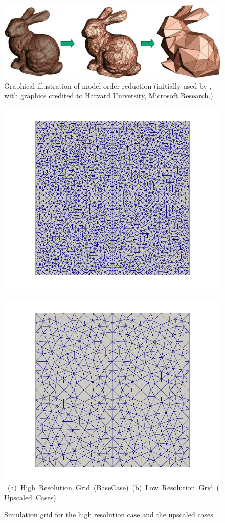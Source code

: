 

\begin{figure}[ht] 
\vbox{\vspace{-1cm}
\centering
\includegraphics[width=.56\textwidth]{./Pics/Introduction/Graphical-illustration-of-model-order-reduction.png}
\vspace{0.cm}
\vspace{0.5cm}
}   
\caption{Graphical illustration of model order reduction (initially used by \citet{Schilders2008}, with graphics credited to Harvard University, Microsoft Research.)}
\vspace{1.5cm}
\label{fig:IllustrationMOR}
\end{figure}

\begin{figure}[ht] 
\vbox{\vspace{-1cm}
\hbox{\includegraphics[width=.56\textwidth]{./Pics/BaseCase/BaseCase_MeshOnly.png}
      \includegraphics[width=.56\textwidth]{./Pics/ArithMeanCase/ArithMeanCase_MeshOnly.png}}
\vspace{0.cm}
\hbox{\hspace{0.25cm} (a) High Resolution Grid (BaseCase) \hspace{0.75cm} (b) Low Resolution Grid (Upscaled Cases) \hspace{3.0cm}}
\vspace{0.5cm}
}   
\caption{Simulation grid for the high resolution case and the upscaled cases}
\label{fig:HiRes_LowRes_Mesh}
\end{figure}



